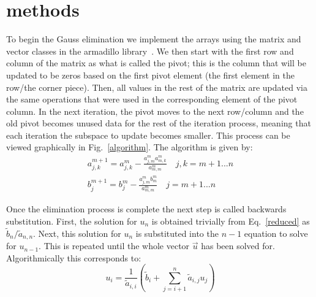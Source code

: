 \documentclass[prc,amsmath,twocolumn,superscriptaddress]{revtex4}
\begin{document}
\section{methods}
\label{methods}
To begin the Gauss elimination we implement the arrays using the matrix and vector classes in the armadillo library~\cite{armadillo}. We then start with the first row and column of the matrix as what is called the pivot; this is the column that will be updated to be zeros based on the first pivot element (the first element in the row/the corner piece). Then, all values in the rest of the matrix are updated via the same operations that were used in the corresponding element of the pivot column. In the next iteration, the pivot moves to the next row/column and the old pivot becomes unused data for the rest of the iteration process, meaning that each iteration the subspace to update becomes smaller. This process can be viewed graphically in Fig.~\ref{algorithm}. The algorithm is given by:
\begin{gather}
a_{j,k}^{m+1}=a_{j,k}^{m}-\frac{a_{j,m}^{m}a_{m,k}^{m}}{a_{m,m}^m} \quad j,k=m+1...n\\
b_j^{m+1}=b_j^m-\frac{a_{j,m}^m b_m^m}{a_{m,m}^m} \quad j=m+1...n 
\end{gather}

Once the elimination process is complete the next step is called backwards substitution. First, the solution for $u_n$ is obtained trivially from Eq.~\ref{reduced} as $\tilde{b}_n/\tilde{a}_{n,n}$. Next, this solution for $u_n$ is substituted into the $n-1$ equation to solve for $u_{n-1}$. This is repeated until the whole vector $\vec{u}$ has been solved for. Algorithmically this corresponds to:
\begin{equation}
u_i=\frac{1}{\tilde{a}_{i,i}}\left(\tilde{b}_i + \sum_{j=i+1}^n \tilde{a}_{i,j}u_j \right)
\end{equation}
\end{document}

